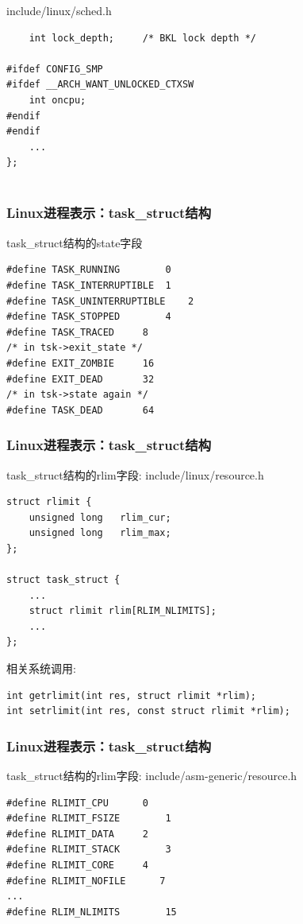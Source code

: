 \documentclass[xcolor=svgnames]{beamer}
\begin{document}
\begin{CJK*}{UTF8}{gbsn}
\begin{frame}[fragile]
\begin{block}{include/linux/sched.h}
\begin{verbatim}
    int lock_depth;     /* BKL lock depth */

#ifdef CONFIG_SMP
#ifdef __ARCH_WANT_UNLOCKED_CTXSW
    int oncpu;
#endif
#endif
    ...
};


\end{verbatim}
\end{block}
\end{frame}

\begin{frame}[fragile]
\frametitle{Linux进程表示：task\_struct结构}
\begin{block}{task\_struct结构的state字段}
\begin{verbatim}
#define TASK_RUNNING        0
#define TASK_INTERRUPTIBLE  1
#define TASK_UNINTERRUPTIBLE    2
#define TASK_STOPPED        4
#define TASK_TRACED     8
/* in tsk->exit_state */
#define EXIT_ZOMBIE     16
#define EXIT_DEAD       32
/* in tsk->state again */
#define TASK_DEAD       64
\end{verbatim}
\end{block}
\end{frame}

\begin{frame}[fragile]
\frametitle{Linux进程表示：task\_struct结构}
\begin{block}{task\_struct结构的rlim字段: include/linux/resource.h}
\begin{verbatim}
struct rlimit {
    unsigned long   rlim_cur;
    unsigned long   rlim_max;
};

struct task_struct {
    ...
    struct rlimit rlim[RLIM_NLIMITS];
    ...
};
\end{verbatim}
\end{block}
\begin{block}{相关系统调用:}
\begin{verbatim}
int getrlimit(int res, struct rlimit *rlim);
int setrlimit(int res, const struct rlimit *rlim);
\end{verbatim}
\end{block}
\end{frame}

\begin{frame}[fragile]
\frametitle{Linux进程表示：task\_struct结构}
\begin{block}{task\_struct结构的rlim字段: include/asm-generic/resource.h}
\begin{verbatim}
#define RLIMIT_CPU      0   
#define RLIMIT_FSIZE        1  
#define RLIMIT_DATA     2   
#define RLIMIT_STACK        3 
#define RLIMIT_CORE     4   
#define RLIMIT_NOFILE      7  
...
#define RLIM_NLIMITS        15
\end{verbatim}
\end{block}
\end{frame}


\end{CJK*}
\end{document}
